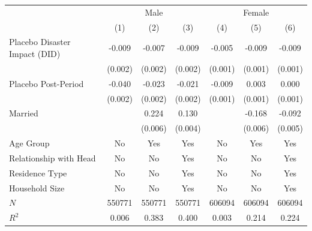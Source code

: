 \documentclass[serif, aspectratio=169]{beamer}
\begin{document}
\begin{frame}[label=regular_placebo]
\begin{table}[htbp]
\begin{tabular}{@{}l*{6}{c}@{}}
          &\multicolumn{3}{c}{Male}                                &\multicolumn{3}{c}{Female}                              \\\cmidrule(lr){2-4}\cmidrule(lr){5-7}
          &\multicolumn{1}{c}{(1)}         &\multicolumn{1}{c}{(2)}         &\multicolumn{1}{c}{(3)}         &\multicolumn{1}{c}{(4)}         &\multicolumn{1}{c}{(5)}         &\multicolumn{1}{c}{(6)}         \\
\toprule
Placebo Disaster Impact (DID)&   -0.009\sym{***}&   -0.007\sym{***}&   -0.009\sym{***}&   -0.005\sym{***}&   -0.009\sym{***}&   -0.009\sym{***}\\
          &  (0.002)         &  (0.002)         &  (0.002)         &  (0.001)         &  (0.001)         &  (0.001)         \\
\addlinespace
Placebo Post-Period&   -0.040\sym{***}&   -0.023\sym{***}&   -0.021\sym{***}&   -0.009\sym{***}&    0.003\sym{**} &    0.000         \\
          &  (0.002)         &  (0.002)         &  (0.002)         &  (0.001)         &  (0.001)         &  (0.001)         \\
\addlinespace
Married   &                  &    0.224\sym{***}&    0.130\sym{***}&                  &   -0.168\sym{***}&   -0.092\sym{***}\\
          &                  &  (0.006)         &  (0.004)         &                  &  (0.006)         &  (0.005)         \\
\midrule
Age Group &       No         &      Yes         &      Yes         &       No         &      Yes         &      Yes         \\
Relationship with Head&       No         &       No         &      Yes         &       No         &       No         &      Yes         \\
Residence Type&       No         &       No         &      Yes         &       No         &       No         &      Yes         \\
Household Size&       No         &       No         &      Yes         &       No         &       No         &      Yes         \\
$\textit{N}$&   550771         &   550771         &   550771         &   606094         &   606094         &   606094         \\
$\textit{R}^2$&    0.006         &    0.383         &    0.400         &    0.003         &    0.214         &    0.224         \\

\end{tabular}
\end{table}
\end{frame}
\end{document}
